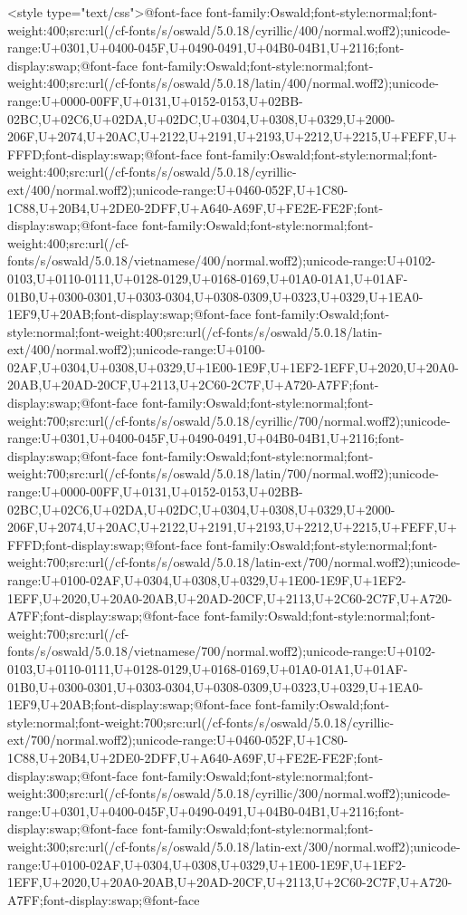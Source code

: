 <style type="text/css">@font-face {font-family:Oswald;font-style:normal;font-weight:400;src:url(/cf-fonts/s/oswald/5.0.18/cyrillic/400/normal.woff2);unicode-range:U+0301,U+0400-045F,U+0490-0491,U+04B0-04B1,U+2116;font-display:swap;}@font-face {font-family:Oswald;font-style:normal;font-weight:400;src:url(/cf-fonts/s/oswald/5.0.18/latin/400/normal.woff2);unicode-range:U+0000-00FF,U+0131,U+0152-0153,U+02BB-02BC,U+02C6,U+02DA,U+02DC,U+0304,U+0308,U+0329,U+2000-206F,U+2074,U+20AC,U+2122,U+2191,U+2193,U+2212,U+2215,U+FEFF,U+FFFD;font-display:swap;}@font-face {font-family:Oswald;font-style:normal;font-weight:400;src:url(/cf-fonts/s/oswald/5.0.18/cyrillic-ext/400/normal.woff2);unicode-range:U+0460-052F,U+1C80-1C88,U+20B4,U+2DE0-2DFF,U+A640-A69F,U+FE2E-FE2F;font-display:swap;}@font-face {font-family:Oswald;font-style:normal;font-weight:400;src:url(/cf-fonts/s/oswald/5.0.18/vietnamese/400/normal.woff2);unicode-range:U+0102-0103,U+0110-0111,U+0128-0129,U+0168-0169,U+01A0-01A1,U+01AF-01B0,U+0300-0301,U+0303-0304,U+0308-0309,U+0323,U+0329,U+1EA0-1EF9,U+20AB;font-display:swap;}@font-face {font-family:Oswald;font-style:normal;font-weight:400;src:url(/cf-fonts/s/oswald/5.0.18/latin-ext/400/normal.woff2);unicode-range:U+0100-02AF,U+0304,U+0308,U+0329,U+1E00-1E9F,U+1EF2-1EFF,U+2020,U+20A0-20AB,U+20AD-20CF,U+2113,U+2C60-2C7F,U+A720-A7FF;font-display:swap;}@font-face {font-family:Oswald;font-style:normal;font-weight:700;src:url(/cf-fonts/s/oswald/5.0.18/cyrillic/700/normal.woff2);unicode-range:U+0301,U+0400-045F,U+0490-0491,U+04B0-04B1,U+2116;font-display:swap;}@font-face {font-family:Oswald;font-style:normal;font-weight:700;src:url(/cf-fonts/s/oswald/5.0.18/latin/700/normal.woff2);unicode-range:U+0000-00FF,U+0131,U+0152-0153,U+02BB-02BC,U+02C6,U+02DA,U+02DC,U+0304,U+0308,U+0329,U+2000-206F,U+2074,U+20AC,U+2122,U+2191,U+2193,U+2212,U+2215,U+FEFF,U+FFFD;font-display:swap;}@font-face {font-family:Oswald;font-style:normal;font-weight:700;src:url(/cf-fonts/s/oswald/5.0.18/latin-ext/700/normal.woff2);unicode-range:U+0100-02AF,U+0304,U+0308,U+0329,U+1E00-1E9F,U+1EF2-1EFF,U+2020,U+20A0-20AB,U+20AD-20CF,U+2113,U+2C60-2C7F,U+A720-A7FF;font-display:swap;}@font-face {font-family:Oswald;font-style:normal;font-weight:700;src:url(/cf-fonts/s/oswald/5.0.18/vietnamese/700/normal.woff2);unicode-range:U+0102-0103,U+0110-0111,U+0128-0129,U+0168-0169,U+01A0-01A1,U+01AF-01B0,U+0300-0301,U+0303-0304,U+0308-0309,U+0323,U+0329,U+1EA0-1EF9,U+20AB;font-display:swap;}@font-face {font-family:Oswald;font-style:normal;font-weight:700;src:url(/cf-fonts/s/oswald/5.0.18/cyrillic-ext/700/normal.woff2);unicode-range:U+0460-052F,U+1C80-1C88,U+20B4,U+2DE0-2DFF,U+A640-A69F,U+FE2E-FE2F;font-display:swap;}@font-face {font-family:Oswald;font-style:normal;font-weight:300;src:url(/cf-fonts/s/oswald/5.0.18/cyrillic/300/normal.woff2);unicode-range:U+0301,U+0400-045F,U+0490-0491,U+04B0-04B1,U+2116;font-display:swap;}@font-face {font-family:Oswald;font-style:normal;font-weight:300;src:url(/cf-fonts/s/oswald/5.0.18/latin-ext/300/normal.woff2);unicode-range:U+0100-02AF,U+0304,U+0308,U+0329,U+1E00-1E9F,U+1EF2-1EFF,U+2020,U+20A0-20AB,U+20AD-20CF,U+2113,U+2C60-2C7F,U+A720-A7FF;font-display:swap;}@font-face 